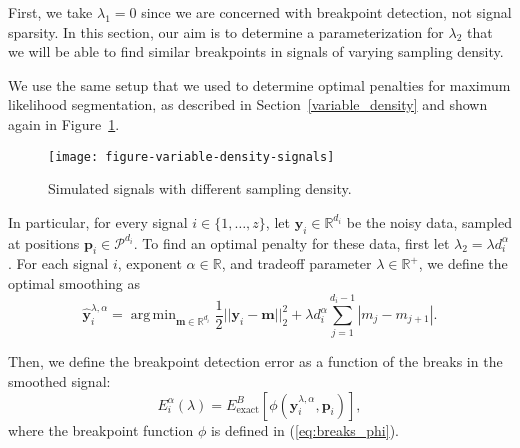 \documentclass{article}
\DeclareMathOperator*{\argmin}{arg\,min}
\newcommand{\RR}{\mathbb{R}}
\begin{document}
First, we take $\lambda_1=0$ since we are concerned with breakpoint
detection, not signal sparsity. In this section, our aim is to
determine a parameterization for $\lambda_2$ that we will be able to
find similar breakpoints in signals of varying sampling density.

We use the same setup that we used to determine optimal penalties for
maximum likelihood segmentation, as described in
Section~\ref{variable_density} and shown again in
Figure~\ref{fig:variable-density-signals-flsa}.

\begin{figure}[h]
  \centering
  \texttt{[image: figure-variable-density-signals]}
  \caption{Simulated signals with different
  sampling density.}
  \label{fig:variable-density-signals-flsa}
\end{figure}

\newpage

In particular, for every signal $i\in\{1,\dots,z\}$, let
$\mathbf y_i\in\RR^{d_i}$ be the noisy data, sampled at positions
$\mathbf p_i\in\mathcal P^{d_i}$. To find an optimal penalty for these data,
first let $\lambda_2 = \lambda d_i^\alpha$. For each signal $i$,
exponent $\alpha\in\RR$, and tradeoff parameter $\lambda\in\RR^+$, we
define the optimal smoothing as
\begin{equation}
  \label{eq:flsa_lambda}
  \mathbf{\hat y}^{\lambda,\alpha}_i = 
\argmin_{\mathbf m\in\RR^{d_i}} 
\frac 1 2 ||\mathbf y_i-\mathbf m||_2^2
+\lambda d_i^\alpha \sum_{j=1}^{d_i-1} |m_j - m_{j+1}|.
\end{equation}

Then, we define the breakpoint detection error as a function of the
breaks in the smoothed signal:
\begin{equation}
  \label{eq:flsa_e_i_alpha}
  E_i^\alpha(\lambda) = 
E^B_{\text{exact}}
\left[
\phi\left(
\mathbf{\hat y}^{\lambda,\alpha}_i, \mathbf p_i
\right)
\right],
\end{equation}
where the breakpoint function $\phi$ is defined in
(\ref{eq:breaks_phi}).
\end{document}
